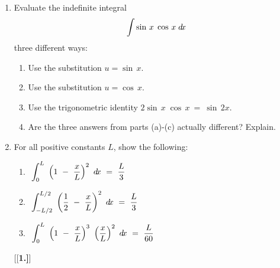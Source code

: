 {\begin{enumerate}[\bfseries 1.]
 \item Evaluate the indefinite integral
  \begin{displaymath}
   \displaystyle\int \sin\,x \; \cos\,x \;d\!x
  \end{displaymath}
  three different ways:
  \begin{enumerate}[\bfseries (a)]
   \item Use the substitution $u = \sin\,x$.
   \item Use the substitution $u = \cos\,x$.
   \item Use the trigonometric identity $2\sin\,x \; \cos\,x ~=~ \sin\,2x$.
   \item Are the three answers from parts (a)-(c) actually different? Explain.
  \end{enumerate}
 \item For all positive constants $L$, show the following:
  \begin{enumerate}[\bfseries (a)]
   \item $~\displaystyle\int_{0}^{L}~\left( 1 ~-~ \frac{x}{L} \right)^2 ~d\!x ~=~
    \frac{L}{3}$
   \item $~\displaystyle\int_{-L/2}^{L/2}~\left( \frac{1}{2} ~-~ \frac{x}{L}
    \right)^2 ~d\!x ~=~ \frac{L}{3}$
   \item $~\displaystyle\int_{0}^{L}~\left( 1 ~-~ \frac{x}{L} \right)^3 ~\left(
    \frac{x}{L} \right)^2 ~d\!x ~=~ \frac{L}{60}$
  \end{enumerate}
[{[\bfseries 1.]}]

\end{enumerate}}
